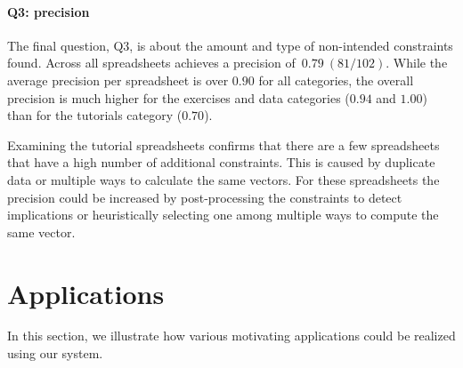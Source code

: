 \paragraph{Q3: precision}
The final question, Q3, is about the amount and type of non-intended constraints found.
Across all spreadsheets \sname achieves a precision of~$0.79~(81/102)$.
While the average precision per spreadsheet is over $0.90$ for all categories, the overall precision is much higher for the exercises and data categories ($0.94$ and $1.00$) than for the tutorials category ($0.70$).

Examining the tutorial spreadsheets confirms that there are a few spreadsheets that have a high number of additional constraints. This is caused by duplicate data or multiple ways to calculate the same vectors. 
For these spreadsheets the precision could be increased by post-processing the constraints to detect implications or heuristically selecting one among multiple ways to compute the same vector.









\section{Applications}\label{sec:applications}
In this section, we illustrate how various motivating applications could be realized using our system.





